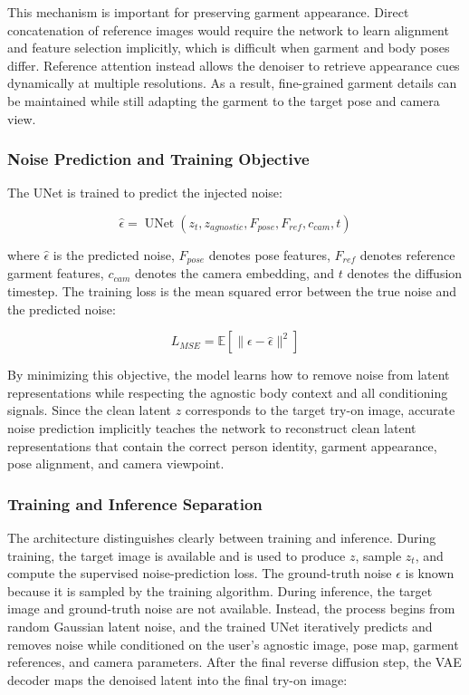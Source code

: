 This mechanism is important for preserving garment appearance. Direct concatenation of reference images would require the network to learn alignment and feature selection implicitly, which is difficult when garment and body poses differ. Reference attention instead allows the denoiser to retrieve appearance cues dynamically at multiple resolutions. As a result, fine-grained garment details can be maintained while still adapting the garment to the target pose and camera view.

\subsubsection*{Noise Prediction and Training Objective}
The UNet is trained to predict the injected noise:

\begin{equation}
\hat{\epsilon} = \operatorname{UNet}(z_t, z_{agnostic}, F_{pose}, F_{ref}, c_{cam}, t)
\end{equation}

where \(\hat{\epsilon}\) is the predicted noise, \(F_{pose}\) denotes pose features, \(F_{ref}\) denotes reference garment features, \(c_{cam}\) denotes the camera embedding, and \(t\) denotes the diffusion timestep. The training loss is the mean squared error between the true noise and the predicted noise:

\begin{equation}
L_{MSE} = \mathbb{E}\left[\lVert \epsilon - \hat{\epsilon} \rVert^2\right]
\end{equation}

By minimizing this objective, the model learns how to remove noise from latent representations while respecting the agnostic body context and all conditioning signals. Since the clean latent \(z\) corresponds to the target try-on image, accurate noise prediction implicitly teaches the network to reconstruct clean latent representations that contain the correct person identity, garment appearance, pose alignment, and camera viewpoint.

\subsubsection*{Training and Inference Separation}
The architecture distinguishes clearly between training and inference. During training, the target image is available and is used to produce \(z\), sample \(z_t\), and compute the supervised noise-prediction loss. The ground-truth noise \(\epsilon\) is known because it is sampled by the training algorithm. During inference, the target image and ground-truth noise are not available. Instead, the process begins from random Gaussian latent noise, and the trained UNet iteratively predicts and removes noise while conditioned on the user's agnostic image, pose map, garment references, and camera parameters. After the final reverse diffusion step, the VAE decoder maps the denoised latent into the final try-on image:

